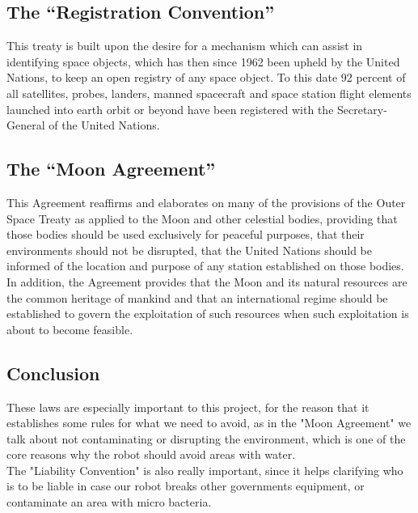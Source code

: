 \subsection{The “Registration Convention”}
This treaty is built upon the desire for a mechanism which can assist in identifying space objects, which has then since 1962 been upheld by the United Nations, to keep an open registry of any space object. 
To this date 92 percent of all satellites, probes, landers, manned spacecraft and space station flight elements launched into earth orbit or beyond have been registered with the Secretary-General of the United Nations\cite{Treaty4}. 

\subsection{The “Moon Agreement”} \label{ch:moonAgreement}
This Agreement reaffirms and elaborates on many of the provisions of the Outer Space Treaty as applied to the Moon and other celestial bodies, providing that those bodies should be used exclusively for peaceful purposes, that their environments should not be disrupted, that the United Nations should be informed of the location and purpose of any station established on those bodies. In addition, the Agreement provides that the Moon and its natural resources are the common heritage of mankind and that an international regime should be established to govern the exploitation of such resources when such exploitation is about to become feasible\cite{Treaty5}.

\subsection{Conclusion}
These laws are especially important to this project, for the reason that it establishes some rules for what we need to avoid, as in the "Moon Agreement" we talk about not contaminating or disrupting the environment, which is one of the core reasons why the robot should avoid areas with water.\\
The "Liability Convention" is also really important, since it helps clarifying who is to be liable in case our robot breaks other governments equipment, or contaminate an area with micro bacteria.
